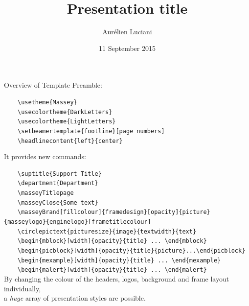 \documentclass[10pt,aspectratio=43]{beamer}
\title[Short title not used by massey template]{Presentation title}
\author{Aurélien Luciani}
\date{11 September 2015}
\begin{document}
\masseyBrand{}{}{}{}{}

\begin{frame}[fragile]{}{Overview of Template}
\setlength\parskip{2ex}
\vspace*{-13ex}
Preamble:

~~~~\verb|\usetheme{Massey}|\\
~~~~\verb|\usecolortheme{DarkLetters}|\\
~~~~\verb|\usecolortheme{LightLetters}|\\
~~~~\verb|\setbeamertemplate{footline}[page numbers]|\\
~~~~\verb|\headlinecontent{left}{center}|

It provides new commands:

\footnotesize
~~~~\verb|\suptitle{Support Title}|\\
~~~~\verb|\department{Department}|\\
~~~~\verb|\masseyTitlepage|\\
~~~~\verb|\masseyClose{Some text}|\\
~~~~\verb|\masseyBrand[fillcolour]{framedesign}[opacity]{picture}{masseylogo}{enginelogo}[frametitlecolour]|\\
~~~~\verb|\circlepictext{picturesize}{image}{textwidth}{text}|\\
~~~~\verb|\begin{mblock}[width]{opacity}{title} ... \end{mblock}|\\
~~~~\verb|\begin{picblock}[width]{opacity}{title}{picture}...\end{picblock}|\\
~~~~\verb|\begin{mexample}[width]{opacity}{title} ... \end{mexample}|\\
~~~~\verb|\begin{malert}[width]{opacity}{title} ... \end{malert}|\\

\vspace{3ex}
\color{masseyRuapehu}
By changing the colour of the headers, logos, background and frame layout individually,\\ a \textsl{huge} array of presentation styles are possible.

\end{frame}
\end{document}
